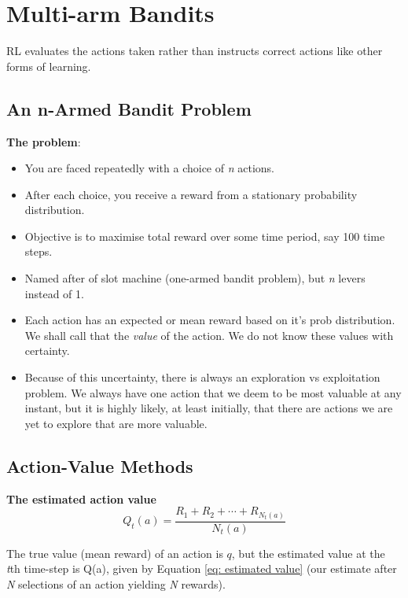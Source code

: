 \section{Multi-arm Bandits}

RL evaluates the actions taken rather than instructs correct actions like other forms of learning.

\subsection{An n-Armed Bandit Problem}
\textbf{The problem}:\\
\begin{itemize}
\item You are faced repeatedly with a choice of \textit{n} actions.
\item After each choice, you receive a reward from a stationary probability distribution.
\item Objective is to maximise total reward over some time period, say 100 time steps.
\item Named after of slot machine (one-armed bandit problem), but \textit{n} levers instead of 1.
\item Each action has an expected or mean reward based on it's prob distribution. We shall call that the \textit{value} of the action. We do not know these values with certainty.
\item Because of this uncertainty, there is always an exploration vs exploitation problem. We always have one action that we deem to be most valuable at any instant, but it is highly likely, at least initially, that there are actions we are yet to explore that are more valuable.
\end{itemize}

\subsection{Action-Value Methods}
\textbf{The estimated action value}
\begin{equation} \label{eq: estimated value}
	Q_t(a) = \frac{R_1+R_2+\cdots+R_{N_t(a)}}{N_t(a)}
\end{equation}

The true value (mean reward) of an action is \(q\), but the estimated value at the \textit{t}th time-step is Q(a), given by Equation \ref{eq: estimated value} (our estimate after \textit{N} selections of an action yielding \textit{N} rewards).\\

